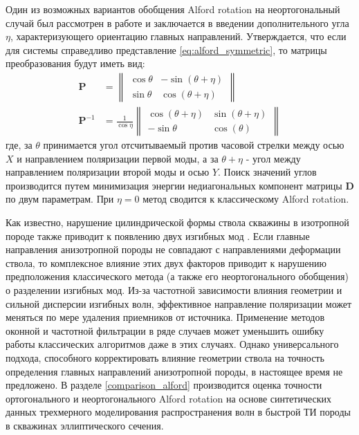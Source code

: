 \documentclass[a4paper,11pt]{article}
\begin{document}
Один из возможных вариантов обобщения Alford rotation на неортогональный случай был рассмотрен в работе \cite{Dellinger1998} и заключается в введении дополнительного угла $\eta$, характеризующего ориентацию главных направлений. Утверждается, что если для системы справедливо представление \eqref{eq:alford_symmetric}, то матрицы преобразования будут иметь вид:
\begin{align*}
\mathbf{P} &= \left\|
\begin{array}{cc}
\cos \theta & -\sin (\theta+\eta) \\ 
\sin \theta & \cos (\theta+\eta)
\end{array} 
\right\| \\
\mathbf{P}^{-1} &= \frac{1}{\cos \eta} \left\|
\begin{array}{cc}
\cos (\theta+\eta) & \sin (\theta+\eta) \\ 
-\sin \theta & \cos (\theta)
\end{array} 
\right\|
\end{align*}
где, за $\theta$ принимается угол отсчитываемый против часовой стрелки между осью $X$ и направлением поляризации первой моды, а за $\theta + \eta$ - угол между направлением поляризации второй моды и осью $Y$. Поиск значений углов производится путем минимизация энергии недиагональных компонент матрицы $\mathbf{D}$ по двум параметрам. При $\eta=0$ метод сводится к классическому Alford rotation. 

Как известно, нарушение цилиндрической формы ствола скважины в изотропной породе также приводит к появлению двух изгибных мод \cite{Seroices2010}. Если главные направления анизотропной породы не совпадают с направлениями деформации ствола, то комплексное влияние этих двух факторов приводит к нарушению предположения классического метода (а также его неортогонального обобщения) о разделении изгибных мод. Из-за частотной зависимости влияния геометрии и сильной дисперсии изгибных волн, эффективное направление поляризации может меняться по мере удаления приемников от источника.
Применение методов оконной и частотной фильтрации в ряде случаев может уменьшить ошибку работы классических алгоритмов даже в этих случаях. Однако универсального подхода, способного корректировать влияние геометрии ствола на точность определения главных направлений анизотропной породы, в настоящее время не предложено. В разделе \ref{comparison_alford} производится оценка точности ортогонального и неортогонального Alford rotation на основе синтетических данных трехмерного моделирования распространения волн в быстрой ТИ породы в скважинах эллиптического сечения.  
\end{document}
